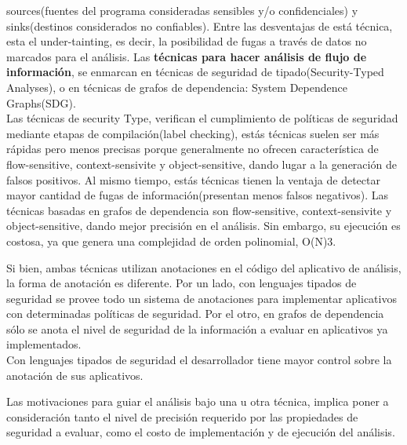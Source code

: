 sources(fuentes del programa consideradas sensibles y/o confidenciales) y
sinks(destinos considerados no confiables). 
Entre las desventajas de está técnica, esta el under-tainting, es
decir, la posibilidad de fugas a través de datos no marcados para el
análisis.\newline
Las \textbf{técnicas para hacer análisis de flujo de información}, se enmarcan
en técnicas de seguridad de tipado(Security-Typed Analyses), o en técnicas de
grafos de dependencia: System Dependence Graphs(SDG).\\
Las técnicas de security Type, verifican el cumplimiento de políticas de
seguridad mediante etapas de compilación(label checking), estás técnicas suelen
ser más rápidas pero menos precisas porque generalmente no ofrecen
característica de flow-sensitive, context-sensivite y object-sensitive, dando
lugar a la generación de falsos positivos. Al mismo tiempo, estás técnicas
tienen la ventaja de detectar mayor cantidad de fugas de información(presentan
menos falsos negativos).\cite{taghdiri-etal-2010}\newline
Las técnicas basadas en grafos de dependencia son flow-sensitive,
context-sensivite y object-sensitive, dando mejor precisión en el análisis. Sin
embargo, su ejecución es costosa, ya que genera una complejidad de orden
polinomial, O(N)3\cite[page 3]{FCO-PDG}.

Si bien, ambas técnicas utilizan anotaciones en el código del aplicativo de
análisis, la forma de anotación es diferente. Por un lado, con lenguajes tipados
de seguridad se provee todo un sistema de anotaciones para implementar
aplicativos con determinadas políticas de seguridad.
Por el otro, en grafos de dependencia sólo se anota el nivel de seguridad de la
información a evaluar en aplicativos ya implementados.\\
Con lenguajes tipados de seguridad el desarrollador tiene mayor control sobre la
anotación de sus aplicativos.

% 
Las motivaciones para guiar el análisis bajo una u otra técnica, implica
poner a consideración tanto el nivel de precisión requerido por las propiedades
de seguridad a evaluar, como el costo de implementación y de ejecución del
análisis. 


